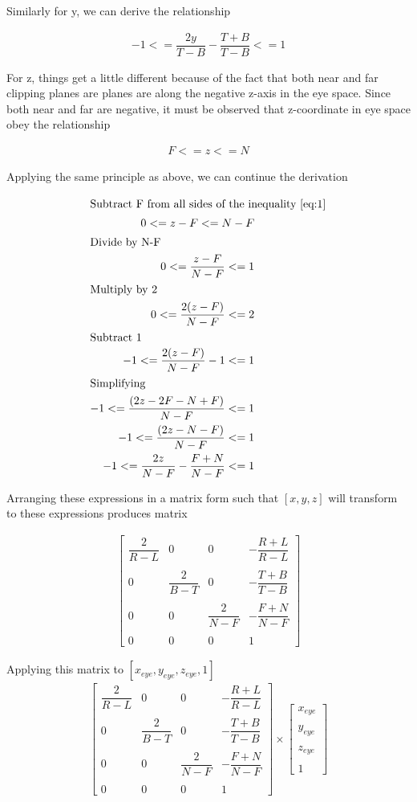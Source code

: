 \documentclass{article}
\newcommand{\orthoMatrix}{
    \begin{bmatrix}
        \dfrac{2}{R-L} & 0 & 0 & -\dfrac{R+L}{R-L} \\ \\
        0 & \dfrac{2}{B-T} & 0 & -\dfrac{T+B}{T-B} \\ \\
        0 & 0 & \dfrac{2}{N-F} & -\dfrac{F+N}{N-F} \\ \\
        0 & 0 & 0 & 1
    \end{bmatrix}
}
\begin{document}
    \par\noindent Similarly for y, we can derive the relationship 
    
    \begin{align}
        -1 <= \dfrac{2y}{T-B}-\dfrac{T+B}{T-B} <= 1
    \end{align}

    \par\noindent For z, things get a little different because of the fact that both near and far clipping planes are planes are along the negative z-axis in the eye space. Since both near and far are negative, it must be observed that z-coordinate in eye space obey the relationship 
    
    \begin{align}
        F <= z <= N
    \end{align}

    \noindent Applying the same principle as above, we can continue the derivation

    \begin{align}
        \intertext{Subtract F from all sides of the inequality \ref{eq:1}}
        0 <= z-F <= N-F \\
        \intertext{Divide by N-F}
        0 <= \dfrac{z-F}{N-F} <= 1 \\
        \intertext{Multiply by 2}
        0 <= \dfrac{2(z-F)}{N-F} <= 2 \\
        \intertext{Subtract 1}
        -1 <= \dfrac{2(z-F)}{N-F} - 1 <= 1 \\
        \intertext{Simplifying}
        -1 <= \dfrac{(2z-2F-N+F)}{N-F} <= 1 \\
        -1 <= \dfrac{(2z-N-F)}{N-F} <= 1 \\
        -1 <= \dfrac{2z}{N-F}-\dfrac{F+N}{N-F} <= 1
    \end{align}

    \noindent Arranging these expressions in a matrix form such that $[x,y,z]$ will transform to these expressions produces matrix
    
    \begin{align}
        \orthoMatrix
    \end{align}

    \noindent Applying this matrix to $[x_{eye},y_{eye},z_{eye},1]$
    \begin{align}
        \orthoMatrix \times \begin{bmatrix} x_{eye} \\ \\ y_{eye} \\ \\ z_{eye} \\ \\ 1 \end{bmatrix}
    \end{align}
\end{document}
